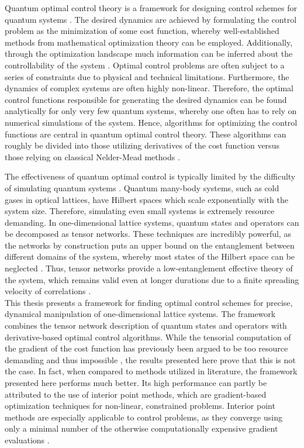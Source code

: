 Quantum optimal control theory is a framework for designing control schemes for quantum systems \cite{Peirce1988,Werschnik2007}. The desired dynamics are achieved by formulating the control problem as the minimization of some cost function, whereby well-established methods from mathematical optimization theory can be employed. Additionally, through the optimization landscape much information can be inferred about the controllability of the system \cite{Rabitz2004}. Optimal control problems are often subject to a series of constraints due to physical and technical limitations. Furthermore, the dynamics of complex systems are often highly non-linear. Therefore, the optimal control functions responsible for generating the desired dynamics can be found analytically for only very few quantum systems, whereby one often has to rely on numerical simulations of the system. Hence, algorithms for optimizing the control functions are central in quantum optimal control theory. These algorithms can roughly be divided into those utilizing derivatives of the cost function \cite{Khaneja2005,Krotov1995} versus those relying on classical Nelder-Mead methods \cite{Doria2011}.

The effectiveness of quantum optimal control is typically limited by the difficulty of simulating quantum systems \cite{Vidal2003}. Quantum many-body systems, such as cold gases in optical lattices, have Hilbert spaces which scale exponentially with the system size. Therefore, simulating even small systems is extremely resource demanding. In one-dimensional lattice systems, quantum states and operators can be decomposed as tensor networks. These techniques are incredibly powerful, as the networks by construction puts an upper bound on the entanglement between different domains of the system, whereby most states of the Hilbert space can be neglected \cite{schollwock,Cramer}. Thus, tensor networks provide a low-entanglement effective theory of the system, which remains valid even at longer durations due to a finite spreading velocity of correlations \cite{Bravyi2006,Eisert2006}.\\

This thesis presents a framework for finding optimal control schemes for precise, dynamical manipulation of one-dimensional lattice systems. The framework combines the tensor network description of quantum states and operators with derivative-based optimal control algorithms. While the tensorial computation of the gradient of the cost function has previously been argued to be too resource demanding and thus impossible \cite{Doria2011}, the results presented here prove that this is not the case. In fact, when compared to methods utilized in literature, the framework presented here performs much better. Its high performance can partly be attributed to the use of interior point methods, which are gradient-based optimization techniques for non-linear, constrained problems. Interior point methods are especially applicable to control problems, as they converge using only a minimal number of the otherwise computationally expensive gradient evaluations \cite{wright}.

